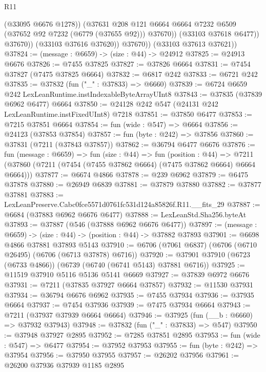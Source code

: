\begin{lexlean}{R11}
\begin{coremodule}
                      (@33095 @6676 @1278))
                    (@37631
                      @208
                      @121
                      @6664
                      @6664
                      @7232
                      @6509
                      (@37652 @92 @7232 (@6779 (@37655 @92)))
                      @37670))
                  (@33103 @37618 @6477))
                @37670))
            (@33103 @37616 @37620))
          @37670))
      (@33103 @37613 @37621))
@37824 := (message : @6659) -> (size : @44) -> @24912
@37825 := @24913 @6676
@37826 := @7455 @37825
@37827 := @37826 @6664
@37831 := @7454 @37827 (@7475 @37825 @6664)
@37832 := @6817 @242
@37833 := @6721 @242
@37835 := @37832 (fun ("_" : @37833) => @6660)
@37839 := @6724 @6659 @242 LexLeanRuntime.instIndexableByteArrayUInt8
@37843 := @37835 (@37839 @6962 @6477) @6664
@37850 := @24128 @242 @547 (@24131 @242 LexLeanRuntime.instFixedUInt8) @7218
@37851 := @37850 @6477
@37853 := @7215 @37851 @6664
@37854 := fun (wide : @547) => @6664
@37856 := @24123 (@37853 @37854)
@37857 := fun (byte : @242) => @37856
@37860 := @37831 (@7211 (@37843 @37857))
@37862 := @36794 @6477 @6676
@37876 := fun (message : @6659) =>
  fun (size : @44) =>
  fun (position : @44) =>
  @7211 (@37860 (@7211 (@7454 (@7455 @37862 @6664) (@7475 @37862 @6664) @6664 @6664)))
@37877 := @6674 @4866
@37878 := @239 @6962
@37879 := @6475 @37878
@37880 := @26949 @6839
@37881 := @37879 @37880
@37882 := @37877 @37881
@37883 := LexLeanPreserve.Cabc0fce5571d0761fc531d124a85826f.R11.__fits_29
@37887 := @6684 (@37883 @6962 @6676 @6477)
@37888 := LexLeanStd.Sha256.byteAt
@37893 := @37887 (@546 (@37888 @6962 @6676 @6477))
@37897 := (message : @6659) -> (size : @44) -> (position : @44) -> @37882 @37893
@37901 := @6698 @4866 @37881 @37893 @5143
@37910 := @6706 (@7061 @6837) (@6706 (@6710 @26495) (@6706 (@6713 @37878) @6716))
@37920 := @37901 @37910 (@6723 (@6733 @4866)) (@6739 (@6740 (@6741 @5143) @37881 @6716))
@37925 := @11519 @37910 @5116 @5136 @5141 @6669
@37927 := @37839 @6972 @6676
@37931 := @7211 (@37835 @37927 @6664 @37857)
@37932 := @11530 @37931
@37934 := @36794 @6676 @6962
@37935 := @7455 @37934
@37936 := @37935 @6664
@37937 := @7454 @37936
@37939 := @7475 @37934 @6664
@37943 := @7211 (@37937 @37939 @6664 @6664)
@37946 := @37925 (fun (__b : @6660) => @37932 @37943)
@37948 := @37832 (fun ("_" : @37833) => @547)
@37950 := @37948 @37927 @2895
@37952 := @7285 @37851 @2895
@37953 := fun (wide : @547) => @6477
@37954 := @37952 @37953
@37955 := fun (byte : @242) => @37954
@37956 := @37950 @37955
@37957 := @26202 @37956
@37961 := @26200 @37936 @37939 @1185 @2895

\end{coremodule}
\end{lexlean}
